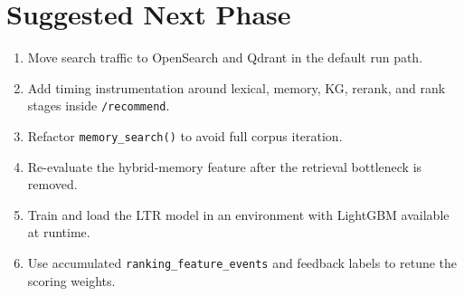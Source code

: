 \documentclass[12pt]{article}
\begin{document}
\section{Suggested Next Phase}
\begin{enumerate}[leftmargin=1.5em]
  \item Move search traffic to OpenSearch and Qdrant in the default run path.
  \item Add timing instrumentation around lexical, memory, KG, rerank, and rank stages inside \texttt{/recommend}.
  \item Refactor \texttt{memory\_search()} to avoid full corpus iteration.
  \item Re-evaluate the hybrid-memory feature after the retrieval bottleneck is removed.
  \item Train and load the LTR model in an environment with LightGBM available at runtime.
  \item Use accumulated \texttt{ranking\_feature\_events} and feedback labels to retune the scoring weights.
\end{enumerate}
\end{document}

